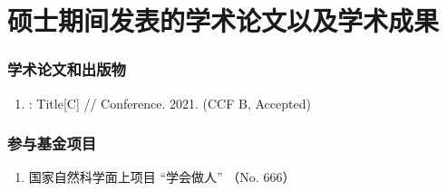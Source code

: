 \chapter*{\large 硕士期间发表的学术论文以及学术成果}

\renewcommand{\labelenumi}{[\arabic{enumi}]}

\subsection*{学术论文和出版物}

\begin{enumerate}	
	\item {}: Title[C] // Conference. 2021. (CCF B, Accepted)

\end{enumerate} 

\subsection*{参与基金项目}

\begin{enumerate}
	\item 国家自然科学面上项目 “学会做人” （No. 666）
\end{enumerate}
